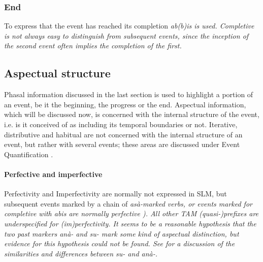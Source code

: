 \subsubsection{End}\label{sec:func:phase:end}
To express that the event has reached its completion \em ab(b)is \em {} is used. Completive is not always easy to distinguish from subsequent events, since the inception of the second event often implies the completion of the first.


\subsection{Aspectual structure}\label{sec:func:Aspectualstructure}
Phasal information discussed in the last section is used to highlight a portion of an event, be it the beginning, the progress or the end.  Aspectual information, which will be discussed now, is concerned with the internal structure of the event, i.e. is it conceived of as including its temporal boundaries or not. Iterative, distributive and habitual are not concerned with the internal structure of an event, but rather with several events; these areas are discussed under Event Quantification .

\paragraph{Perfective and imperfective}\label{sec:func:asp:Imperfective}
Perfectivity and Imperfectivity are normally not expressed in SLM, but subsequent events marked by a chain of \em asà-\em marked verbs, or events marked for completive with \em abis \em are normally perfective \citep[171]{SmithEtAl2006cll}). All other TAM (quasi-)prefixes are underspecified for (im)perfectivity. It seems to be a reasonable hypothesis that the two past markers \em anà- \em and \em su- \em mark some kind of aspectual distinction, but evidence for this hypothesis could not be found. See  for a discussion of the similarities and differences between \em su- \em and \em anà-\em.

